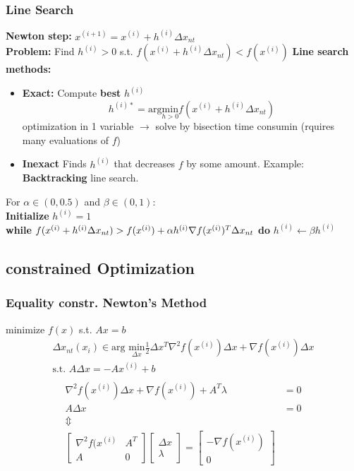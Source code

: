 \subsubsection{Line Search}
\textbf{Newton step:} $\boxed{x^{(i+1)}=x^{(i)}+h^{(i)}\Delta x_{nt} }$\\
\textbf{Problem: } Find $h^{(i)} > 0$ s.t. $f(x^{(i)}+h^{(i)}\Delta x_{nt }) <f(x^{(i)})$
\textbf{Line search methods:}
\begin{itemize}
\item \textbf{Exact:} Compute \textbf{best} $h^{(i)}$
\[h^{(i)*}= \mathrm{arg}\underset{h>0}{\mathrm{min}}f(x^{(i)}+h^{(i)}\Delta x_{nt})\]
optimization in 1 variable $\rightarrow$ solve by bisection time consumin (rquires many evaluations of $f$)
\item \textbf{Inexact} Finds $h^{(i)}$ that decreases $f$ by some amount. Example: \textbf{Backtracking} line search.
\end{itemize}
For $\alpha \in (0,0.5)$ and $\beta \in (0,1)$:\\
\hspace*{3mm} \textbf{Initialize} $h^{(i)} = 1$\\
\hspace*{3mm} \textbf{while} $f(x^{(i)}+h^{(i)}\Delta x_{nt}) > f(x^{(i)})+\alpha h^{(i)}\nabla f(x^{(i)})^T\Delta x_{nt}\\$
\hspace*{5mm}    \textbf{do} $h^{(i)}\leftarrow\beta h^{(i)}$
\subsection{constrained Optimization}
\subsubsection{Equality constr. Newton's Method}
minimize $f(x)$ s.t. $Ax=b$
\begin{gather*}
    \Delta x_{nt}
(x_i) \in \textrm{arg }\underset{\Delta x}{\textrm{min}} \frac{1}{2}\Delta x^T\nabla^2 f(x^{(i)})\Delta x+\nabla f(x^{(i)})\Delta x \\
\textrm{s.t. } A \Delta x = -A x^{(i)} + b\\
\end{gather*}
\begin{align*}
\nabla^2 f(x^{(i)})\Delta x + \nabla f(x^{(i)}) + A^T \lambda &= 0\\
    A\Delta x &= 0\\
    \Updownarrow\\
    \begin{bmatrix}
    \nabla^2f(x^{(i)} & A^T \\
    A & 0
    \end{bmatrix}
    \begin{bmatrix}
    \Delta x \\
    \lambda 
    \end{bmatrix} = \begin{bmatrix}
    -\nabla f(x^{(i)}) \\ 0
    \end{bmatrix}
\end{align*}
